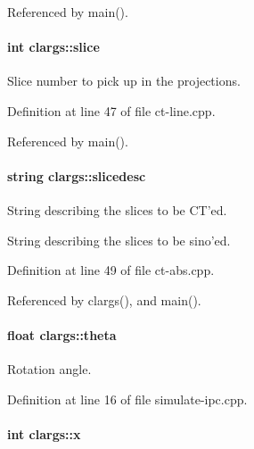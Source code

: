 Referenced by main().

\hypertarget{structclargs_a0cff1a299f1fb048671785956704fad9}{
\paragraph[{slice}]{\setlength{\rightskip}{0pt plus 5cm}int {\bf clargs::slice}}\hfill}
\label{structclargs_a0cff1a299f1fb048671785956704fad9}


Slice number to pick up in the projections. 



Definition at line 47 of file ct-\/line.cpp.



Referenced by main().

\hypertarget{structclargs_af4d41991f44d2287ae4c479046e6729e}{
\paragraph[{slicedesc}]{\setlength{\rightskip}{0pt plus 5cm}string {\bf clargs::slicedesc}}\hfill}
\label{structclargs_af4d41991f44d2287ae4c479046e6729e}


String describing the slices to be CT'ed. 

String describing the slices to be sino'ed. 

Definition at line 49 of file ct-\/abs.cpp.



Referenced by clargs(), and main().

\hypertarget{structclargs_a41a3be7cfbde077785e05d906ce893ad}{
\paragraph[{theta}]{\setlength{\rightskip}{0pt plus 5cm}float {\bf clargs::theta}}\hfill}
\label{structclargs_a41a3be7cfbde077785e05d906ce893ad}


Rotation angle. 



Definition at line 16 of file simulate-\/ipc.cpp.

\hypertarget{structclargs_a67d1e09c6d040b61e30e2813c84c378a}{
\paragraph[{x}]{\setlength{\rightskip}{0pt plus 5cm}int {\bf clargs::x}}\hfill}
\label{structclargs_a67d1e09c6d040b61e30e2813c84c378a}


